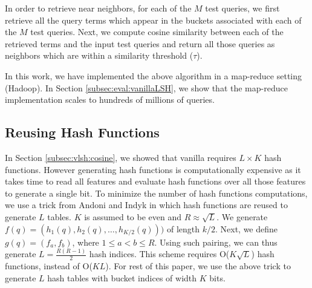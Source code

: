 In order to retrieve near neighbors, for each of the $M$ test queries, we first 
retrieve all the query terms which appear in the buckets associated with each of the $M$ test queries. 
Next, we compute cosine similarity between each of the retrieved terms 
and the input test queries and return all those queries as neighbors 
which are within a similarity threshold ($\tau$). 

In this work, we have implemented the above algorithm in a map-reduce setting (Hadoop).  
In Section \ref{subsec:eval:vanillaLSH}, we show that the map-reduce implementation scales to hundreds of millions of queries.  

\subsection{Reusing Hash Functions}
\label{subsec:resuseHash}
In Section \ref{subsec:vlsh:cosine}, we showed that vanilla \lsh requires $L\times K$ hash functions. 
However generating hash functions is computationally expensive as 
it takes time to read all features and 
evaluate hash functions over all those features to generate a single bit. 
To minimize the number of hash functions computations, 
we use a trick from Andoni and Indyk  
in which hash functions are reused to generate $L$ tables. $K$ is assumed to be even and $R \approx	\sqrt L$. 
We generate $f(q)=(h_1(q),h_2(q),\dots,h_{K/2}(q)))$ of length $k/2$. 
Next, we define $g(q)=(f_a,f_b)$, where $1\leq a < b \leq R$. Using such pairing, we
can thus generate $L= \frac{R (R -1)}{2}$ hash indices. 
This scheme requires O($K  \sqrt L$) hash functions, instead of O($KL$).    
For rest of this paper, we use the above trick to generate $L$ hash tables with bucket indices of width $K$ bits.  

